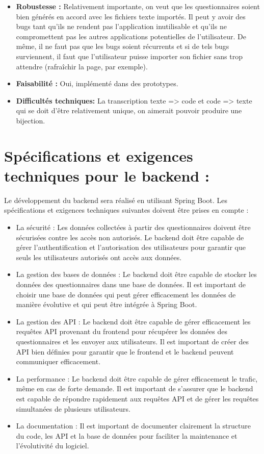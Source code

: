 \documentclass{article}
\begin{document}
\begin{enumerate}[noitemsep]
\begin{itemize}[noitemsep]
    \item \textbf{Robustesse : }Relativement importante, on veut que les questionnaires soient bien générés en accord avec les fichiers texte importés. Il peut y avoir des bugs tant qu'ils ne rendent pas l'application inutilisable et qu'ils ne compromettent pas les autres applications potentielles de l'utilisateur. De même, il ne faut pas que les bugs soient récurrents et si de tels bugs surviennent, il faut que l'utilisateur puisse importer son fichier sans trop attendre (rafraîchir la page, par exemple).
    \item \textbf{Faisabilité : }Oui, implémenté dans des prototypes.
    \item \textbf{Difficultés techniques: } La transcription texte => code et code => texte qui se doit d'être relativement unique, on aimerait pouvoir produire une bijection.
\end{itemize}
\end{enumerate}


\section{Spécifications et exigences techniques pour le backend :}

Le développement du backend sera réalisé en utilisant Spring Boot. Les spécifications et exigences techniques suivantes doivent être prises en compte :

\begin{itemize}[noitemsep]
\item La sécurité : Les données collectées à partir des questionnaires doivent être sécurisées contre les accès non autorisés. Le backend doit être capable de gérer l'authentification et l'autorisation des utilisateurs pour garantir que seuls les utilisateurs autorisés ont accès aux données.
\item La gestion des bases de données : Le backend doit être capable de stocker les données des questionnaires dans une base de données. Il est important de choisir une base de données qui peut gérer efficacement les données de manière évolutive et qui peut être intégrée à Spring Boot.
\item La gestion des API : Le backend doit être capable de gérer efficacement les requêtes API provenant du frontend pour récupérer les données des questionnaires et les envoyer aux utilisateurs. Il est important de créer des API bien définies pour garantir que le frontend et le backend peuvent communiquer efficacement.
\item La performance : Le backend doit être capable de gérer efficacement le trafic, même en cas de forte demande. Il est important de s'assurer que le backend est capable de répondre rapidement aux requêtes API et de gérer les requêtes simultanées de plusieurs utilisateurs.
\item La documentation : Il est important de documenter clairement la structure du code, les API et la base de données pour faciliter la maintenance et l'évolutivité du logiciel.
\end{itemize}
\end{document}

